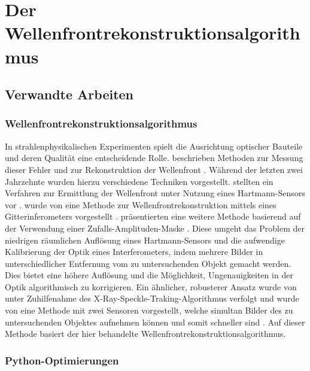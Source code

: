 \chapter{Der Wellenfrontrekonstruktionsalgorithmus}

\section{Verwandte Arbeiten}

\subsection{Wellenfrontrekonstruktionsalgorithmus}

In strahlenphysikalischen Experimenten spielt die Ausrichtung optischer Bauteile und deren Qualität eine entscheidende Rolle. \citeauthor{GNS+11} beschrieben \citeyear{GNS+11} Methoden zur Messung dieser Fehler und zur Rekonstruktion der Wellenfront \cite{GNS+11}. Während der letzten zwei Jahrzehnte wurden hierzu verschiedene Techniken vorgestellt. \citeauthor{MZI+03} stellten \citeyear{MZI+03} ein Verfahren zur Ermittlung der Wellenfront unter Nutzung eines Hartmann-Sensors vor \cite{MZI+03}. \citeyear{WND+05} wurde von \citeauthor{WND+05} eine Methode zur Wellenfrontrekonstruktion mittels eines Gitterinferometers vorgestellt \cite{WND+05}. \citeauthor{APO+07} präsentierten \citeyear{APO+07} eine weitere Methode basierend auf der Verwendung einer Zufalls-Amplituden-Maske \cite{APO+07}. Diese umgeht das Problem der niedrigen räumlichen Auflösung eines Hartmann-Sensors und die aufwendige Kalibrierung der Optik eines Interferometers, indem mehrere Bilder in unterschiedlicher Entfernung vom zu untersuchenden Objekt gemacht werden. Dies bietet eine höhere Auflösung und die Möglichkeit, Ungenauigkeiten in der Optik algorithmisch zu korrigieren. Ein ähnlicher, robusterer Ansatz wurde \citeyear{Ber12} von \citeauthor{Ber12} unter Zuhilfenahme des X-Ray-Speckle-Traking-Algorithmus verfolgt \cite{Ber12} und \citeyear{Ber13} wurde von \citeauthor{Ber13} eine Methode mit zwei Sensoren vorgestellt, welche simultan Bilder des zu untersuchenden Objektes aufnehmen können und somit schneller sind \cite{Ber13}. Auf dieser Methode basiert der hier behandelte Wellenfrontrekonstruktionsalgorithmus. 

\subsection{Python-Optimierungen}

